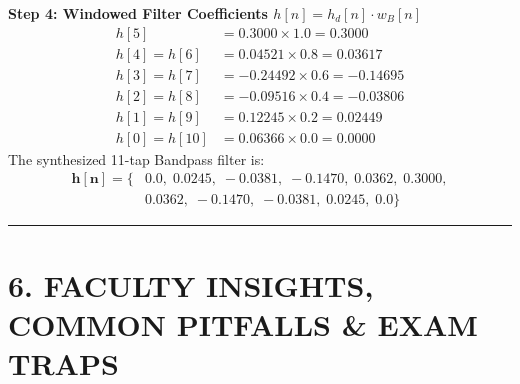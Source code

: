 \documentclass[11pt,a4paper]{article}
\begin{document}
\vspace{1mm}
\noindent\textbf{Step 4: Windowed Filter Coefficients $h[n] = h_d[n] \cdot w_B[n]$}
\begin{align}
h[5] &= 0.3000 \times 1.0 = \mathbf{0.3000} \\
h[4] = h[6] &= 0.04521 \times 0.8 = \mathbf{0.03617} \\
h[3] = h[7] &= -0.24492 \times 0.6 = \mathbf{-0.14695} \\
h[2] = h[8] &= -0.09516 \times 0.4 = \mathbf{-0.03806} \\
h[1] = h[9] &= 0.12245 \times 0.2 = \mathbf{0.02449} \\
h[0] = h[10] &= 0.06366 \times 0.0 = \mathbf{0.0000}
\end{align}
The synthesized 11-tap Bandpass filter is:
\begin{align}
\mathbf{h[n] = \{ }& \mathbf{0.0, \; 0.0245, \; -0.0381, \; -0.1470, \; 0.0362, \; 0.3000,} \nonumber \\
& \mathbf{0.0362, \; -0.1470, \; -0.0381, \; 0.0245, \; 0.0 \} }
\end{align}

\noindent\rule{\textwidth}{0.5pt}

\section{6. FACULTY INSIGHTS, COMMON PITFALLS \& EXAM TRAPS}
\end{document}
